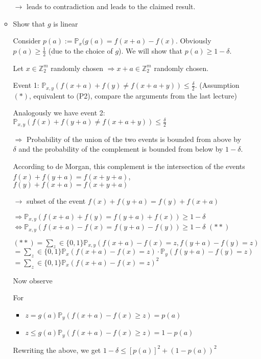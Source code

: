 \documentclass[11pt]{article}
\theoremstyle{definition}
\theoremstyle{definition}
\begin{document}
\begin{enumerate}
\begin{itemize}
	$ \rightarrow $ leads to contradiction and leads to the claimed result.
	\item Show that $ g $ is linear

	Consider $ p(a) := \mathbb{P}_x (g(a) = f(x + a) - f(x) $. Obviously $ p(a) \geq \frac{1}{2} $ (due to the choice of $ g $). We will show that $ p(a) \geq 1 - \delta $.
	
	Let $ x \in \mathbb{Z}_2^m $ randomly chosen $ \Rightarrow x + a \in \mathbb{Z}_2^m $ randomly chosen.
	
	Event 1:
	$ \mathbb{P}_{x, y} (f(x + a) + f(y) \neq f(x + a + y)) \leq \frac{\delta}{2} $. (Assumption $(\ast) $, equivalent to (P2), compare the arguments from the last lecture)
	
	Analogously we have event 2:
	$ \mathbb{P}_{x, y} (f(x) + f(y + a) \neq f(x + a + y)) \leq \frac{\delta}{2} $
	
	$ \Rightarrow $ Probability of the union of the two events is bounded from above by $ \delta $ and the probability of the complement is bounded from below by $ 1 - \delta $.
	
	According to de Morgan, this complement is the intersection of the events
	$ f(x) + f(y + a) = f(x + y + a) $, $ f(y) + f(x + a) = f(x + y + a) $
	
	$ \rightarrow $ subset of the event $ f(x) + f(y + a) = f(y) + f(x + a) $
	
	$ \Rightarrow \mathbb{P}_{x, y} (f(x + a) + f(y) = f(y + a) + f(x)) \geq 1 - \delta $
	$ \Leftrightarrow \mathbb{P}_{x, y} (f(x + a) - f(x) = f(y + a) - f(y)) \geq 1 - \delta $ $ (\ast \ast) $
	
	$ (\ast \ast) = \sum \limits_{z} \in \{0, 1\} \mathbb{P}_{x, y} (f(x + a) - f(x) = z, f(y + a) - f(y) = z) $
	$ = \sum \limits_{z} \in \{0, 1\} \mathbb{P}_{x} (f(x + a) - f(x) = z) \cdot \mathbb{P}_{y} (f(y + a) - f(y) = z) $
	$ = \sum \limits_{z} \in \{0, 1\} \mathbb{P}_{x} (f(x + a) - f(x) = z)^2 $
	
	Now observe
	
	For
		\begin{itemize}
		\item $ z = g(a) \mathbb{P}_y(f(x + a) - f(x) \geq z) = p(a) $
		\item $ z \leq g(a) \mathbb{P}_y(f(x + a) - f(x) \geq z) = 1 - p(a) $
		\end{itemize}
	
	Rewriting the above, we get
	$ 1 - \delta \leq [p(a)]^2 + (1 - p(a))^2 $
	

\end{itemize}
\end{enumerate}
\end{document}
